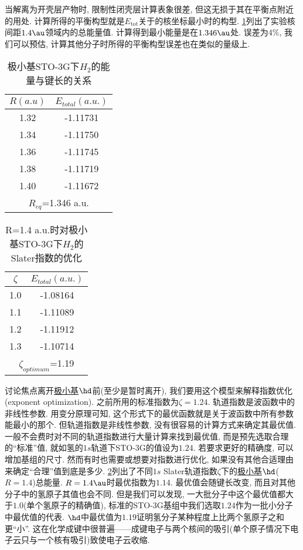 当解离为开壳层产物时, 限制性闭壳层\hft 计算表象很差, 但这无损于其在平衡点附近的用处. 计算所得的平衡构型就是$E_\mathrm{tot}$关于的核坐标最小时的构型. \ref{t3.2}列出了实验核间距$1.4\au$领域内的总能量值. 计算得到最小能量是在$1.346\au$处. 误差为$4\%$, 我们可以预估, 计算其他分子时所得的平衡构型误差也在类似的量级上. 
\begin{table}[H]
	\centering
	\caption{极小基STO-3G下$H_2$的能量与键长的关系}
	\begin{tabular}{cc}
		\hline
		$R(a.u)$ & $E_{total}(a.u.)$\\\hline
		1.32      & -1.11731\\
		1.34     & -1.11750\\
		1.36     & -1.11745\\
		1.38     & -1.11719\\
		1.40     & -1.11672\\\hline
		\multicolumn{2}{c}{$R_{eq}$=1.346 a.u.}
	\end{tabular}
	\label{t3.2}
\end{table}
\begin{table}[H]
	\centering
	\caption{R=1.4 a.u.时对极小基STO-3G下$H_2$的Slater指数的优化}
	\begin{tabular}{cc}
		\hline
		$\zeta$ & $E_{total}(a.u.)$\\\hline
		1.0      & -1.08164\\
		1.1     & -1.11089\\
		1.2     & -1.11912\\
		1.3     & -1.10714\\\hline
		\multicolumn{2}{c}{$\zeta_{optimum}$=1.19}
	\end{tabular}
	\label{t3.3}
\end{table}
讨论焦点离开\underline{极小基$\hd$}前(至少是暂时离开), 我们要用这个模型来解释指数优化(exponent optimization). 之前所用的标准指数为$\zeta=1.24$. 轨道指数是波函数中的非线性参数. 用变分原理可知, 这个形式下的最优函数就是关于波函数中所有参数能最小的那个. 但轨道指数是非线性参数, 没有很容易的计算方式来确定其最优值. 一般不会费时对不同的轨道指数进行大量计算来找到最优值, 而是预先选取合理的``标准''值, 就如氢的$1s$轨道下STO-3G的值设为$1.24$. 若要求更好的精确度, 可以增加基组的尺寸. 然而有时也需要或想要对指数进行优化, 如果没有其他合适理由来确定``合理''值到底是多少. \ref{t3.3}列出了不同$1s$ Slater轨道指数$\zeta$下的\underline{极小基$\hd$}($R=1.4$)总能量. $R=1.4\au$时最优指数为$1.14$. 最优值会随键长改变, 而且对其他分子中的氢原子其值也会不同. 但是我们可以发现, 一大批分子中这个最优值都大于$1.0$(单个氢原子的精确值), 标准的STO-3G基组中我们选取$1.24$作为一批小分子中最优值的代表. $\hd$中最优值为$1.19$证明氢分子某种程度上比两个氢原子之和更``小”. 这在化学成键中很普遍——成键电子与两个核间的吸引(单个原子情况下电子云只与一个核有吸引)致使电子云收缩. 
